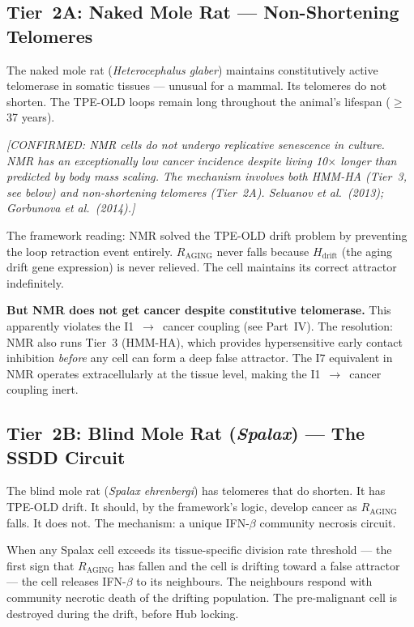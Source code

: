 \documentclass[12pt,a4paper]{article}
\newcommand{\raging}{$R_{\mathrm{AGING}}$}
\newcommand{\tpeold}{TPE-OLD}
\newcommand{\confirmed}[1]{\textit{[CONFIRMED: #1]}}
\begin{document}
\subsection{Tier~2A: Naked Mole Rat --- Non-Shortening Telomeres}

The naked mole rat (\textit{Heterocephalus glaber}) maintains constitutively
active telomerase in somatic tissues --- unusual for a mammal. Its telomeres
do not shorten. The \tpeold{} loops remain long throughout the animal's
lifespan ($\geq$37 years).

\confirmed{NMR cells do not undergo replicative senescence in culture. NMR
has an exceptionally low cancer incidence despite living 10$\times$ longer than
predicted by body mass scaling. The mechanism involves both HMM-HA (Tier~3,
see below) and non-shortening telomeres (Tier~2A). Seluanov et al.\ (2013);
Gorbunova et al.\ (2014).}

The framework reading: NMR solved the \tpeold{} drift problem by preventing
the loop retraction event entirely. \raging{} never falls because $H_{\mathrm{drift}}$
(the aging drift gene expression) is never relieved. The cell maintains its
correct attractor indefinitely.

\textbf{But NMR does not get cancer despite constitutive telomerase.} This
apparently violates the I1~$\to$~cancer coupling (see Part~IV). The resolution:
NMR also runs Tier~3 (HMM-HA), which provides hypersensitive early contact
inhibition \textit{before} any cell can form a deep false attractor. The I7
equivalent in NMR operates extracellularly at the tissue level, making the
I1~$\to$~cancer coupling inert.

\subsection{Tier~2B: Blind Mole Rat (\textit{Spalax}) --- The SSDD Circuit}

The blind mole rat (\textit{Spalax ehrenbergi}) has telomeres that do shorten.
It has \tpeold{} drift. It should, by the framework's logic, develop cancer as
\raging{} falls. It does not. The mechanism: a unique IFN-$\beta$ community
necrosis circuit.

When any Spalax cell exceeds its tissue-specific division rate threshold ---
the first sign that \raging{} has fallen and the cell is drifting toward a
false attractor --- the cell releases IFN-$\beta$ to its neighbours. The
neighbours respond with community necrotic death of the drifting population.
The pre-malignant cell is destroyed during the drift, before Hub locking.
\end{document}
